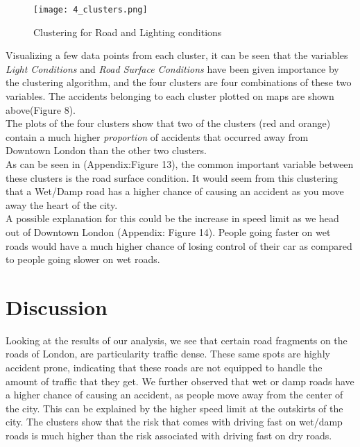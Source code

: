 \documentclass{neu_handout}
\begin{document}
\begin{figure}[!htb]
    \begin{center}
      \texttt{[image: 4\_clusters.png]}
      \caption{Clustering for Road and Lighting conditions}
    \end{center}
\end{figure}

Visualizing a few data points from each cluster, it can be seen that the variables \textit{Light Conditions} and \textit{Road Surface Conditions}  have been given importance by the clustering algorithm, and the four clusters are four combinations of these two variables. The accidents belonging to each cluster plotted on maps are shown above(Figure 8). \\ 



The plots of the four clusters show that two of the clusters (red and orange) contain a much higher \textit{proportion} of accidents that occurred away from Downtown London than the other two clusters. \\


As can be seen in (Appendix:Figure 13), the common important variable between these clusters is the road surface condition. It would seem from this clustering that a Wet/Damp road has a higher chance of causing an accident as you move away the heart of the city. \\ 

A possible explanation for this could be the increase in speed limit as we head out of Downtown London (Appendix: Figure 14). People going faster on wet roads would have a much higher chance of losing control of their car as compared to people going slower on wet roads. \\

\section{Discussion}
Looking at the results of our analysis, we see that certain road fragments on the roads of London, are particularity traffic dense. These same spots are highly accident prone, indicating that these roads are not equipped to handle the amount of traffic that they get. We further observed that wet or damp roads have a higher chance of causing an accident, as people move away from the center of the city. This can be explained by the higher speed limit at the outskirts of the city. The clusters show that the risk that comes with driving fast on wet/damp roads is much higher than the risk associated with driving fast on dry roads. \\
\end{document}
